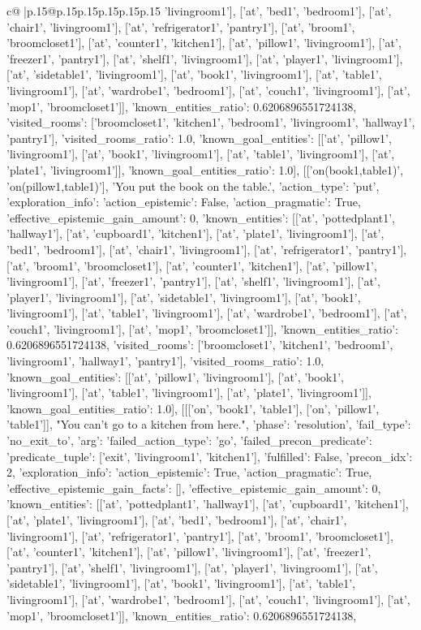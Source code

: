 \documentclass{article}
\begin{document}
{\begin{supertabular}{c@{$\;$}|p{.15\linewidth}@{}p{.15\linewidth}p{.15\linewidth}p{.15\linewidth}p{.15\linewidth}p{.15\linewidth}}
{{{'livingroom1'], ['at', 'bed1', 'bedroom1'], ['at', 'chair1', 'livingroom1'], ['at', 'refrigerator1', 'pantry1'], ['at', 'broom1', 'broomcloset1'], ['at', 'counter1', 'kitchen1'], ['at', 'pillow1', 'livingroom1'], ['at', 'freezer1', 'pantry1'], ['at', 'shelf1', 'livingroom1'], ['at', 'player1', 'livingroom1'], ['at', 'sidetable1', 'livingroom1'], ['at', 'book1', 'livingroom1'], ['at', 'table1', 'livingroom1'], ['at', 'wardrobe1', 'bedroom1'], ['at', 'couch1', 'livingroom1'], ['at', 'mop1', 'broomcloset1']], 'known_entities_ratio': 0.6206896551724138, 'visited_rooms': ['broomcloset1', 'kitchen1', 'bedroom1', 'livingroom1', 'hallway1', 'pantry1'], 'visited_rooms_ratio': 1.0, 'known_goal_entities': [['at', 'pillow1', 'livingroom1'], ['at', 'book1', 'livingroom1'], ['at', 'table1', 'livingroom1'], ['at', 'plate1', 'livingroom1']], 'known_goal_entities_ratio': 1.0}}], [['on(book1,table1)', 'on(pillow1,table1)'], 'You put the book on the table.', {'action_type': 'put', 'exploration_info': {'action_epistemic': False, 'action_pragmatic': True, 'effective_epistemic_gain_amount': 0, 'known_entities': [['at', 'pottedplant1', 'hallway1'], ['at', 'cupboard1', 'kitchen1'], ['at', 'plate1', 'livingroom1'], ['at', 'bed1', 'bedroom1'], ['at', 'chair1', 'livingroom1'], ['at', 'refrigerator1', 'pantry1'], ['at', 'broom1', 'broomcloset1'], ['at', 'counter1', 'kitchen1'], ['at', 'pillow1', 'livingroom1'], ['at', 'freezer1', 'pantry1'], ['at', 'shelf1', 'livingroom1'], ['at', 'player1', 'livingroom1'], ['at', 'sidetable1', 'livingroom1'], ['at', 'book1', 'livingroom1'], ['at', 'table1', 'livingroom1'], ['at', 'wardrobe1', 'bedroom1'], ['at', 'couch1', 'livingroom1'], ['at', 'mop1', 'broomcloset1']], 'known_entities_ratio': 0.6206896551724138, 'visited_rooms': ['broomcloset1', 'kitchen1', 'bedroom1', 'livingroom1', 'hallway1', 'pantry1'], 'visited_rooms_ratio': 1.0, 'known_goal_entities': [['at', 'pillow1', 'livingroom1'], ['at', 'book1', 'livingroom1'], ['at', 'table1', 'livingroom1'], ['at', 'plate1', 'livingroom1']], 'known_goal_entities_ratio': 1.0}}], [[['on', 'book1', 'table1'], ['on', 'pillow1', 'table1']], "You can't go to a kitchen from here.", {'phase': 'resolution', 'fail_type': 'no_exit_to', 'arg': {'failed_action_type': 'go', 'failed_precon_predicate': {'predicate_tuple': ['exit', 'livingroom1', 'kitchen1'], 'fulfilled': False, 'precon_idx': 2}}, 'exploration_info': {'action_epistemic': True, 'action_pragmatic': True, 'effective_epistemic_gain_facts': [], 'effective_epistemic_gain_amount': 0, 'known_entities': [['at', 'pottedplant1', 'hallway1'], ['at', 'cupboard1', 'kitchen1'], ['at', 'plate1', 'livingroom1'], ['at', 'bed1', 'bedroom1'], ['at', 'chair1', 'livingroom1'], ['at', 'refrigerator1', 'pantry1'], ['at', 'broom1', 'broomcloset1'], ['at', 'counter1', 'kitchen1'], ['at', 'pillow1', 'livingroom1'], ['at', 'freezer1', 'pantry1'], ['at', 'shelf1', 'livingroom1'], ['at', 'player1', 'livingroom1'], ['at', 'sidetable1', 'livingroom1'], ['at', 'book1', 'livingroom1'], ['at', 'table1', 'livingroom1'], ['at', 'wardrobe1', 'bedroom1'], ['at', 'couch1', 'livingroom1'], ['at', 'mop1', 'broomcloset1']], 'known_entities_ratio': 0.6206896551724138, }}}
\end{supertabular}}
\end{document}
